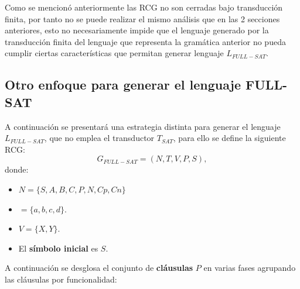 Como se mencionó anteriormente las RCG no son cerradas bajo transducción finita, por tanto no se puede realizar el mismo 
análisis que en las 2 secciones anteriores, esto no necesariamente impide que el lenguaje generado por la transducción finita del lenguaje que 
representa la gramática anterior no pueda cumplir ciertas características que permitan generar lenguaje $L_{FULL-SAT}$. 

\subsection{Otro enfoque para generar el lenguaje FULL-SAT}

A continuación se presentará una estrategia distinta para generar el lenguaje $L_{FULL-SAT}$, que no emplea el transductor $T_{SAT}$,
para ello se define la siguiente RCG:
\[
    G_{FULL-SAT} = (N, T, V, P, S),
\]
donde:

\begin{itemize}
    \item $N=\{S,A,B,C,P,N,Cp,Cn\}$
    \item $=\{a,b,c,d\}$.
    \item $V=\{X,Y\}$.
    \item El \textbf{símbolo inicial} es $S$.
\end{itemize}

A continuación se desglosa el conjunto de \textbf{cláusulas} $P$ en varias fases agrupando las cláusulas
por funcionalidad:

